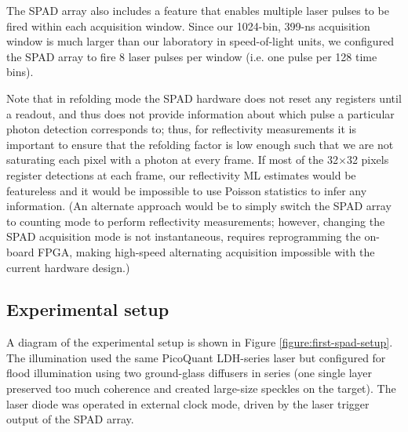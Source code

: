The SPAD array also includes a feature that enables multiple laser pulses to be fired within each acquisition window. Since our 1024-bin, 399-ns acquisition window is much larger than our laboratory in speed-of-light units, we configured the SPAD array to fire 8 laser pulses per window (i.e. one pulse per 128 time bins).

Note that in refolding mode the SPAD hardware does not reset any registers until a readout, and thus does not provide information about which pulse a particular photon detection corresponds to; thus, for reflectivity measurements it is important to ensure that the refolding factor is low enough such that we are not saturating each pixel with a photon at every frame. If most of the 32$\times$32 pixels register detections at each frame, our reflectivity ML estimates would be featureless and it would be impossible to use Poisson statistics to infer any information. (An alternate approach would be to simply switch the SPAD array to counting mode to perform reflectivity measurements; however, changing the SPAD acquisition mode is not instantaneous, requires reprogramming the on-board FPGA, making high-speed alternating acquisition impossible with the current hardware design.)

\subsection{Experimental setup}
A diagram of the experimental setup is shown in Figure \ref{figure:first-spad-setup}. The illumination used the same PicoQuant LDH-series laser but configured for flood illumination using two ground-glass diffusers in series (one single layer preserved too much coherence and created large-size speckles on the target). The laser diode was operated in external clock mode, driven by the laser trigger output of the SPAD array.
 

